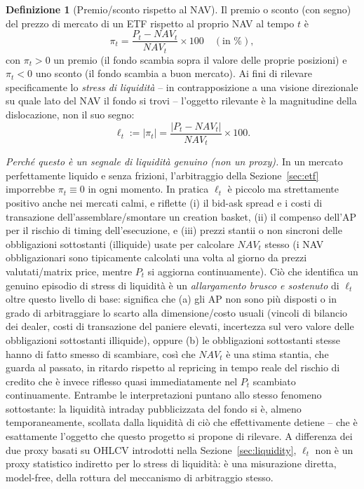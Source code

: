 \documentclass[11pt]{article}
\theoremstyle{definition}
\newtheorem{definition}[theorem]{Definizione}
\theoremstyle{remark}
\begin{document}
\begin{definition}[Premio/sconto rispetto al NAV]
Il premio o sconto (con segno) del prezzo di mercato di un ETF rispetto al proprio NAV al tempo $t$ \`e
\[
\pi_t = \frac{P_t - NAV_t}{NAV_t} \times 100 \quad(\text{in \%}),
\]
con $\pi_t>0$ un premio (il fondo scambia sopra il valore delle proprie posizioni) e $\pi_t<0$ uno sconto (il fondo scambia a buon mercato). Ai fini di rilevare specificamente lo \emph{stress di liquidit\`a} -- in contrapposizione a una visione direzionale su quale lato del NAV il fondo si trovi -- l'oggetto rilevante \`e la magnitudine della dislocazione, non il suo segno:
\[
\boxed{\ \ell_t := |\pi_t| = \frac{|P_t - NAV_t|}{NAV_t}\times 100.\ }
\]
\end{definition}

\emph{Perch\'e questo \`e un segnale di liquidit\`a genuino (non un proxy).} In un mercato perfettamente liquido e senza frizioni, l'arbitraggio della Sezione~\ref{sec:etf} imporrebbe $\pi_t\equiv0$ in ogni momento. In pratica $\ell_t$ \`e piccolo ma strettamente positivo anche nei mercati calmi, e riflette (i) il bid-ask spread e i costi di transazione dell'assemblare/smontare un creation basket, (ii) il compenso dell'AP per il rischio di timing dell'esecuzione, e (iii) prezzi stantii o non sincroni delle obbligazioni sottostanti (illiquide) usate per calcolare $NAV_t$ stesso (i NAV obbligazionari sono tipicamente calcolati una volta al giorno da prezzi valutati/matrix price, mentre $P_t$ si aggiorna continuamente). Ci\`o che identifica un genuino episodio di stress di liquidit\`a \`e un \emph{allargamento brusco e sostenuto} di $\ell_t$ oltre questo livello di base: significa che (a) gli AP non sono pi\`u disposti o in grado di arbitraggiare lo scarto alla dimensione/costo usuali (vincoli di bilancio dei dealer, costi di transazione del paniere elevati, incertezza sul vero valore delle obbligazioni sottostanti illiquide), oppure (b) le obbligazioni sottostanti stesse hanno di fatto smesso di scambiare, cos\`i che $NAV_t$ \`e una stima stantia, che guarda al passato, in ritardo rispetto al repricing in tempo reale del rischio di credito che \`e invece riflesso quasi immediatamente nel $P_t$ scambiato continuamente. Entrambe le interpretazioni puntano allo stesso fenomeno sottostante: la liquidit\`a intraday pubblicizzata del fondo si \`e, almeno temporaneamente, scollata dalla liquidit\`a di ci\`o che effettivamente detiene -- che \`e esattamente l'oggetto che questo progetto si propone di rilevare. A differenza dei due proxy basati su OHLCV introdotti nella Sezione~\ref{sec:liquidity}, $\ell_t$ non \`e un proxy statistico indiretto per lo stress di liquidit\`a: \`e una misurazione diretta, model-free, della rottura del meccanismo di arbitraggio stesso.
\end{document}
